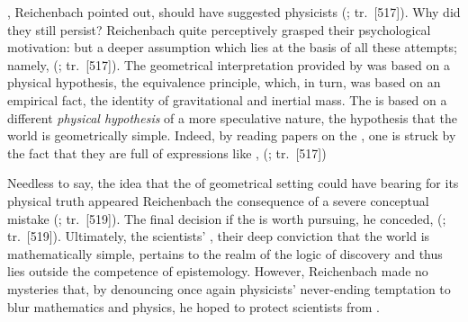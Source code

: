 \documentclass[final]{article}
\renewcommand{\rzlap}[2]{(\cite[#1]{Reichenbach1928}; tr.\ [#2])\xspace}
\begin{document}
, Reichenbach pointed out, should have suggested physicists  \rzlap{370}{517}. Why did they still persist? Reichenbach quite perceptively grasped their psychological motivation:  but a deeper assumption which lies at the basis of all these attempts; namely,  \rzlap{370}{517}. The geometrical interpretation provided by \gr was based on a physical hypothesis, the equivalence principle, which, in turn, was based on an empirical fact, the identity of gravitational and inertial mass. The \uftp is based on a different \emph{physical hypothesis} of a more speculative nature, the hypothesis that the world is geometrically simple. Indeed, by reading papers on the \uft, one is struck by the fact that they are full of expressions like , \etc \rzlap{370}{517}

Needless to say, the idea that the  of geometrical setting could have bearing for its physical truth appeared Reichenbach the consequence of a severe conceptual mistake \rzlap{372}{519}. The final decision if the \uftp is worth pursuing, he conceded,  \rzlap{372}{519}. Ultimately, the scientists' , their deep conviction that the world is mathematically simple, pertains to the realm of the logic of discovery and thus lies outside the competence of epistemology. However, Reichenbach made no mysteries that, by denouncing once again physicists' never-ending temptation to blur mathematics and physics, he hoped to protect scientists from  \citep[373]{Reichenbach1928}. 
\end{document}
